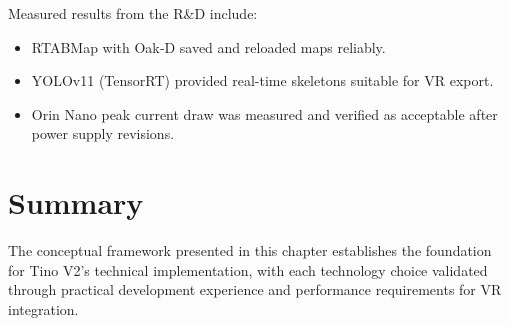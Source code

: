 Measured results from the R\&D include:
\begin{itemize}[nosep]
	\item RTABMap with Oak‑D saved and reloaded maps reliably.
	\item YOLOv11 (TensorRT) provided real-time skeletons suitable for VR export.
	\item Orin Nano peak current draw was measured and verified as acceptable after power supply revisions.
\end{itemize}

\section{Summary}

The conceptual framework presented in this chapter establishes the foundation for Tino V2's technical implementation, with each technology choice validated through practical development experience and performance requirements for VR integration.

